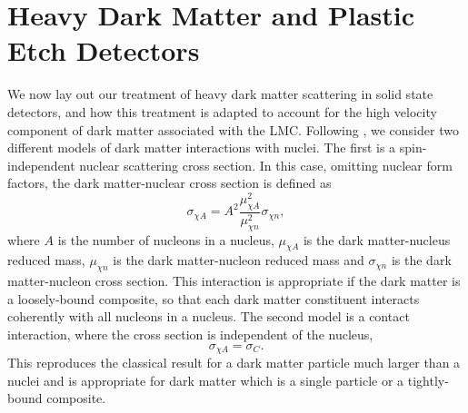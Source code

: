 \documentclass[12pt]{article}
\begin{document}
\section{Heavy Dark Matter and Plastic Etch Detectors}
\label{sec:models}
We now lay out our treatment of heavy dark matter scattering in solid state detectors, and how this treatment is adapted to account for the high velocity component of dark matter associated with the LMC. Following \cite{Bhoonah2021}, we consider two different models of dark matter interactions with nuclei. The first is a spin-independent nuclear scattering cross section. In this case, omitting nuclear form factors, the dark matter-nuclear cross section is defined as
\begin{equation}
    \sigma_{\chi A} = A^{2} \frac{\mu_{\chi A}^{2}}{\mu_{\chi n}^{2}} \sigma_{\chi n},
\end{equation}
where $A$ is the number of nucleons in a nucleus, $\mu_{\chi A}$ is the dark matter-nucleus reduced mass, $\mu_{\chi n}$ is the dark matter-nucleon reduced mass and $\sigma_{\chi n}$ is the dark matter-nucleon cross section.
This interaction is appropriate if the dark matter is a loosely-bound composite, so that each dark matter constituent interacts coherently with all nucleons in a nucleus.
 The second model is a contact interaction, where the cross section is independent of the nucleus,
 \begin{equation}
    \sigma_{\chi A} = \sigma_{C}.
\end{equation}
This reproduces the classical result for a dark matter particle much larger than a nuclei and is appropriate for dark matter which is a single particle or a tightly-bound composite.
\end{document}
